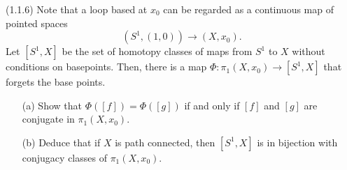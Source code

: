 \documentclass[12pt]{article}
\begin{document}
\begin{problab}{4}
(1.1.6) Note that a loop based at \( x_0 \) can be regarded as a continuous map of pointed spaces
\[
(S^1, (1, 0)) \to (X, x_0).
\]
Let \( [S^1, X] \) be the set of homotopy classes of maps from \( S^1 \) to \( X \) without conditions on basepoints. Then, there is a map \( \Phi : \pi_1(X, x_0) \to [S^1, X] \) that forgets the base points.
\begin{itemize}
    \item[(a)] Show that \( \Phi([f]) = \Phi([g]) \) if and only if \( [f] \) and \( [g] \) are conjugate in \( \pi_1(X, x_0) \).
    \item[(b)] Deduce that if \( X \) is path connected, then \( [S^1, X] \) is in bijection with conjugacy classes of \( \pi_1(X, x_0) \).
\end{itemize}
\end{problab}
\end{document}

